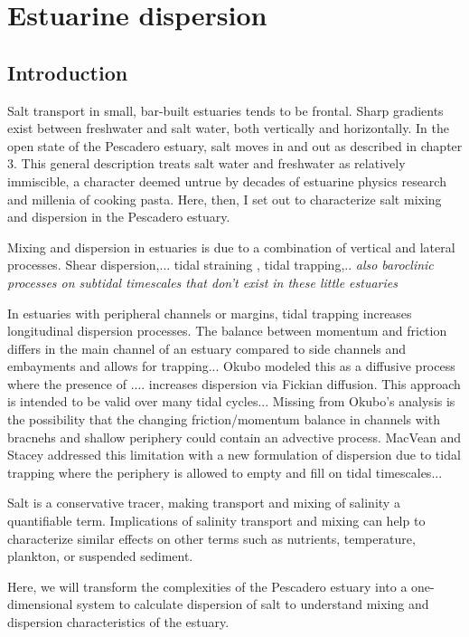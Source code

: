 \chapter{Estuarine dispersion}
\label{chSalt}


\section{Introduction}

Salt transport in small, bar-built estuaries tends to be frontal. Sharp gradients exist between freshwater and salt water, both vertically and horizontally. In the open state of the Pescadero estuary, salt moves in and out as described in chapter 3. This general description treats salt water and freshwater as relatively immiscible, a character deemed untrue by decades of estuarine physics research and millenia of cooking pasta. Here, then, I set out to characterize salt mixing and dispersion in the Pescadero estuary. 

Mixing and dispersion in estuaries is due to a combination of vertical and lateral processes. Shear dispersion,... tidal straining \parencite{Simpson:1990aa}, tidal trapping,.. \emph{also baroclinic processes on subtidal timescales that don't exist in these little estuaries}

In estuaries with peripheral channels or margins, tidal trapping increases longitudinal dispersion processes. The balance between momentum and friction differs in the main channel of an estuary compared to side channels and embayments and allows for trapping...  Okubo \parencite*{okubo_effect_1973} modeled this as a diffusive process where the presence of .... increases dispersion via Fickian diffusion. This approach is intended to be valid over many tidal cycles... Missing from Okubo's analysis is the possibility that the changing friction/momentum balance in channels with bracnehs and shallow periphery could contain an advective process. MacVean and Stacey \parencite*{macvean_estuarine_2011} addressed this limitation with a new formulation of dispersion due to tidal trapping where the periphery is allowed to empty and fill on tidal timescales... 

Salt is a conservative tracer, making transport and mixing of salinity a quantifiable term. Implications of salinity transport and mixing can help to characterize similar effects on other terms such as nutrients, temperature, plankton, or suspended sediment. 

Here, we will transform the complexities of the Pescadero estuary into a one-dimensional system to calculate dispersion of salt to understand mixing and dispersion characteristics of the estuary.

